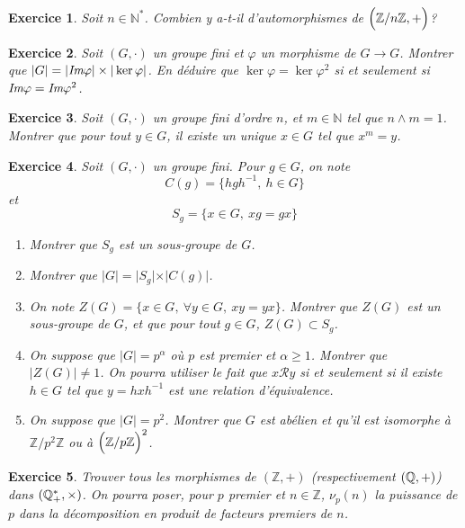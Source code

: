 \documentclass[12pt]{article}
\newtheorem{exercise}{Exercice}[section]
\theoremstyle{remark}
\theoremstyle{remark}
\newcommand{\N}{\mathbb{N}} \newcommand{\Z}{\mathbb{Z}}
\begin{document}
\begin{exercise}
	Soit $n\in\N^*$. Combien y a-t-il d'automorphismes de $\Bigl(\Z/n\Z, +\Bigr)$?
\end{exercise}

\begin{exercise}
	Soit $(G,\cdot)$ un groupe fini et $\varphi$ un morphisme de $G\to G$. Montrer
	que $\vert G\vert=\vert\emph{Im}\varphi\vert\times\vert\ker\varphi\vert$. En déduire
	que $\ker\varphi=\ker\varphi^2$ si et seulement si $\emph{Im}\varphi=\emph{Im}\varphi^2$.
	
\end{exercise}

\begin{exercise}
	Soit $(G,\cdot)$ un groupe fini d'ordre $n$, et $m\in\N$ tel que $n\wedge
	m=1$. Montrer que pour tout $y\in G$, il existe un unique $x\in G$ tel que
	$x^m=y$.
\end{exercise}

\begin{exercise}
	Soit $(G,\cdot)$ un groupe fini. Pour $g\in G$, on note 
	$$C(g)=\{hgh^{-1},~h\in G\}$$ et 
	$$S_{g}=\{x\in G,~xg=gx\}$$
	\begin{enumerate}
		\item
		Montrer que $S_{g}$ est un sous-groupe de $G$.
		\item
		Montrer que $\vert G\vert=\vert S_{g}\vert\times\vert C(g)\vert$.
		\item
		On note $Z(G)=\{x\in G,~\forall y\in G,~xy=yx\}$. Montrer que $Z(G)$ est
		un sous-groupe de $G$, et que pour tout $g\in G$, $Z(G)\subset S_{g}$.
		\item
		On suppose que $\vert G\vert=p^{\alpha}$ où $p$ est premier et
		$\alpha\geqslant1$. Montrer que $\vert Z(G)\vert\neq1$. On pourra utiliser
		le fait que $x\mathcal{R}y$ si et seulement si il existe $h\in G$ tel que
		$y=hxh^{-1}$ est une relation d'équivalence.
		\item
		On suppose que $\vert G\vert=p^{2}$. Montrer que $G$ est abélien et qu'il
		est isomorphe à $\Z/p^2\Z$ ou à $\Bigl(\Z/p\Z\Bigr)^2$.
	\end{enumerate}
\end{exercise}

\begin{exercise}
	Trouver tous les morphismes de $(\Z,+)$ (respectivement $(\mathbb{Q},+)$) dans
	$(\mathbb{Q}_{+}^*,\times)$. On pourra poser, pour $p$ premier et $n\in\Z$,
	$\nu_{p}(n)$ la puissance de $p$ dans la décomposition en produit de facteurs
	premiers de $n$.
\end{exercise}
\end{document}
